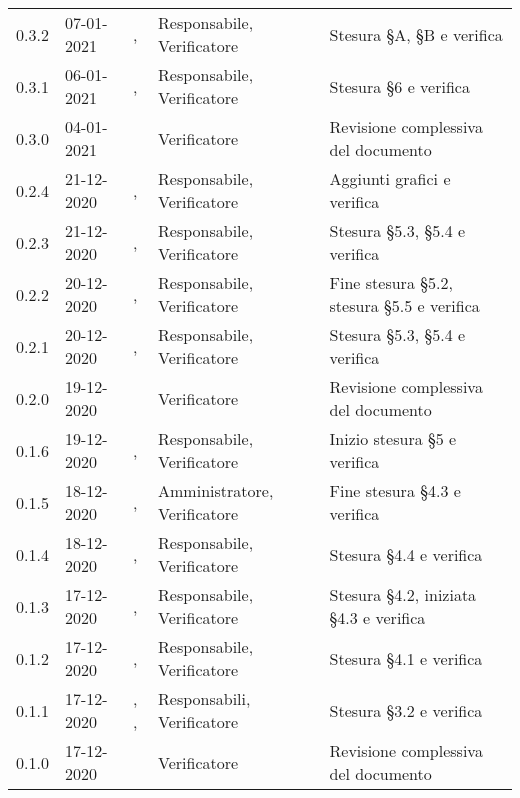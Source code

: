 {{\begin{longtable}{C{1.7cm} | C{2.2cm} | C{3.2cm} | C{3cm} | C{4.8cm}}
0.3.2 & 07-01-2021 & \BM{}, \ZM{} & Responsabile, Verificatore & Stesura \S A, \S B e verifica \\

0.3.1 & 06-01-2021 & \BM{}, \SH{} & Responsabile, Verificatore & Stesura \S 6 e verifica\\

0.3.0 & 04-01-2021 & \SH{} & Verificatore & Revisione complessiva del documento \\

0.2.4 & 21-12-2020 & \SG{}, \SH{} & Responsabile, Verificatore & Aggiunti grafici  e verifica\\

0.2.3 & 21-12-2020 & \BM{}, \ZM{} & Responsabile, Verificatore & Stesura \S 5.3, \S 5.4 e verifica\\

0.2.2 & 20-12-2020 & \SG{}, \ZM{} & Responsabile, Verificatore & Fine stesura \S 5.2, stesura \S 5.5  e verifica\\

0.2.1 & 20-12-2020 & \BM{}, \ZM{} & Responsabile, Verificatore & Stesura \S 5.3, \S 5.4 e verifica\\

0.2.0 & 19-12-2020 & \ZM{} & Verificatore & Revisione complessiva del documento \\

0.1.6 & 19-12-2020 & \SG{}, \SH{} & Responsabile, Verificatore & Inizio stesura \S 5 e verifica\\

0.1.5 & 18-12-2020 & \PA{}, \SH{} & Amministratore, Verificatore & Fine stesura \S 4.3 e verifica\\

0.1.4 & 18-12-2020 & \SG{}, \ZM{} & Responsabile, Verificatore & Stesura \S 4.4 e verifica \\

0.1.3 & 17-12-2020 & \BM{}, \ZM{} & Responsabile, Verificatore & Stesura \S 4.2, iniziata \S 4.3 e verifica \\

0.1.2 & 17-12-2020 & \SG{}, \ZM{} & Responsabile, Verificatore & Stesura \S 4.1 e verifica\\

0.1.1 & 17-12-2020 & \SG{}, \BM{}, \SH{} & Responsabili, Verificatore & Stesura \S 3.2 e verifica \\

0.1.0 & 17-12-2020 & \ZM{} & Verificatore & Revisione complessiva del documento \\


\end{longtable}}}

